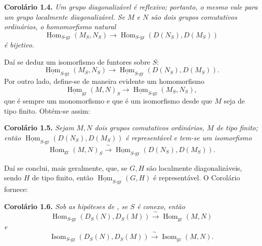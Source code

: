 
\medskip
\noindent{}\textbf{Corolário 1.4.}
\textit{Um grupo diagonalizável é reflexivo; portanto, o mesmo vale para
um grupo localmente diagonalizável. Se \(M\) e \(N\) são dois grupos
comutativos ordinários, o homomorfismo natural}
\[
  \operatorname{Hom}_{S\text{-}\mathrm{gr}}(M_S,N_S)
  \longrightarrow
  \operatorname{Hom}_{S\text{-}\mathrm{gr}}(D(N_S),D(M_S))
\]
\textit{é bijetivo.}

Daí se deduz um isomorfismo de funtores sobre \(S\):
\[
  \underline{\operatorname{Hom}}_{S\text{-}\mathrm{gr}}(M_S,N_S)
  \longrightarrow
  \underline{\operatorname{Hom}}_{S\text{-}\mathrm{gr}}(D(N_S),D(M_S)).
\]
Por outro lado, define-se de maneira evidente um homomorfismo
\[
  \underline{\operatorname{Hom}}_{\mathrm{gr}}(M,N)_S
  \longrightarrow
  \underline{\operatorname{Hom}}_{S\text{-}\mathrm{gr}}(M_S,N_S),
\]
que é sempre um monomorfismo e que é um isomorfismo desde que \(M\) seja
de tipo finito. Obtém-se assim:

\medskip
\noindent{}\textbf{Corolário 1.5.}
\textit{Sejam \(M,N\) dois grupos comutativos ordinários, \(M\) de tipo
finito; então \(\underline{\operatorname{Hom}}_{S\text{-}\mathrm{gr}}
(D(N_S),D(M_S))\) é representável e tem-se um isomorfismo}
\[
  \operatorname{Hom}_{\mathrm{gr}}(M,N)_S
  \xrightarrow{\ \sim\ }
  \underline{\operatorname{Hom}}_{S\text{-}\mathrm{gr}}(D(N_S),D(M_S)).
\]

Daí se conclui, mais geralmente, que, se \(G,H\) são localmente
diagonalizáveis, sendo \(H\) de tipo finito, então
\(\underline{\operatorname{Hom}}_{S\text{-}\mathrm{gr}}(G,H)\) é
representável.
O Corolário~ fornece:

\medskip
\noindent{}\textbf{Corolário 1.6.}
\textit{Sob as hipóteses de
, se \(S\) é conexo, então}
\[
  \operatorname{Hom}_{S\text{-}\mathrm{gr}}(D_S(N),D_S(M))
  \xrightarrow{\ \sim\ }
  \operatorname{Hom}_{\mathrm{gr}}(M,N)
\]
\textit{e}
\[
  \operatorname{Isom}_{S\text{-}\mathrm{gr}}(D_S(N),D_S(M))
  \xrightarrow{\ \sim\ }
  \operatorname{Isom}_{\mathrm{gr}}(M,N).
\]

